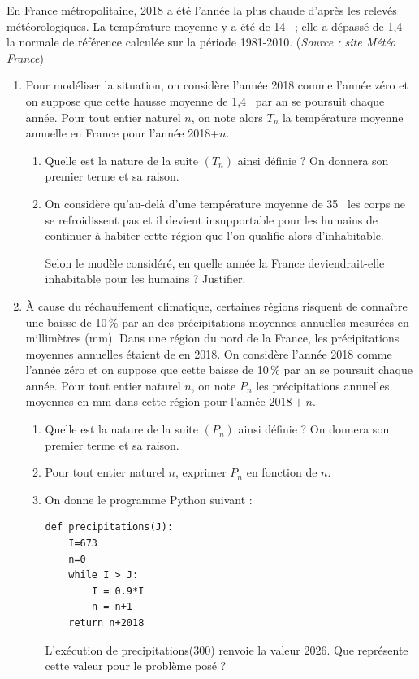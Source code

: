 \medskip

En France métropolitaine, 2018 a été l'année la plus chaude d'après les relevés météorologiques. La température moyenne y a été de 14~\textcelsius{} ; elle a dépassé de 1,4~\textcelsius{} la normale de référence calculée sur la période 1981-2010. (\emph{Source : site Météo France})

\medskip

\begin{enumerate}
\item Pour modéliser la situation, on considère l'année 2018 comme l'année zéro et on suppose que cette hausse moyenne de 1,4~\textcelsius{} par an se poursuit chaque année. Pour tout entier naturel $n$, on note alors $T_n$ la température moyenne annuelle en France pour l'année 2018+$n$.
	\begin{enumerate}
		\item Quelle est la nature de la suite $\left(T_n\right)$ ainsi définie ? On donnera son premier terme et sa raison.
		\item On considère qu'au-delà d'une température moyenne de 35~\textcelsius{} les corps ne se refroidissent pas et il devient insupportable pour les humains de continuer à habiter cette région que l'on qualifie alors d'inhabitable.

Selon le modèle considéré, en quelle année la France deviendrait-elle inhabitable pour les humains ? Justifier.
	\end{enumerate}
\item À cause du réchauffement climatique, certaines régions risquent de connaître une baisse de 10\,\% par an des précipitations moyennes annuelles mesurées en millimètres (mm). Dans une région du nord de la France, les précipitations moyennes annuelles étaient de   en 2018. On considère l'année 2018 comme l'année zéro et on suppose que cette baisse de 10\,\% par an se poursuit chaque année. Pour tout entier naturel $n$, on note $P_n$ les précipitations annuelles moyennes en mm dans cette région pour l'année $2018+n$.
	\begin{enumerate}
		\item  Quelle est la nature de la suite $\left(P_n\right)$ ainsi définie ? On donnera son premier terme et sa raison.
		\item Pour tout entier naturel $n$, exprimer $P_n$ en fonction de $n$.
		\item On donne le programme Python suivant :

\begin{lstlisting}[style=python]
def precipitations(J):
	I=673
	n=0
	while I > J:
		I = 0.9*I
		n = n+1
	return n+2018
\end{lstlisting}

L'exécution de \og precipitations(300) \fg{} renvoie la valeur 2026. Que représente cette valeur pour le problème posé ?
	\end{enumerate}
\end{enumerate}

\vspace{0,5cm}
